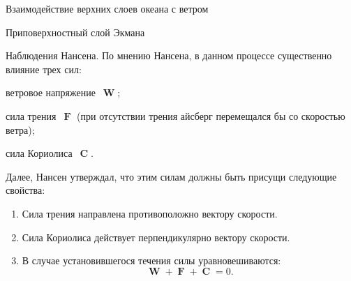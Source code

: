\begin{chapter}{Взаимодействие верхних слоев океана с ветром}
\begin{section}{Приповерхностный слой Экмана}
\begin{paragraph}{Наблюдения Нансена.}
По мнению Нансена, в данном процессе существенно влияние трех сил:
\begin{enumparen}
\item ветровое напряжение~$\mbfW$;
%

\item 
сила трения~$\mbfF$ (при отсутствии трения айсберг перемещался бы со скоростью
ветра);
%

\item 
сила Кориолиса~$\mbfC$.
%
\end{enumparen}
Далее, Нансен утверждал, что этим силам должны быть присущи следующие 
свойства:
%
\begin{enumerate}
\item 
Сила трения направлена противоположно вектору скорости.
%

\item 
Сила Кориолиса действует перпендикулярно вектору скорости.
%

\item 
В случае установившегося течения силы уравновешиваются:  
\begin{displaymath}
 \mbfW + \mbfF + \mbfC = 0.
\end{displaymath}
%
\end{enumerate}
\end{paragraph}


\end{section}
\end{chapter}
